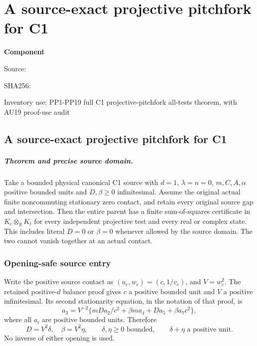 \chapter{A source-exact projective pitchfork for C1}
\label{component:p2cdf6197677b}
\noindent\textbf{Component }\par
{\small\noindent Source: \par}
{\small\noindent SHA256: \par}
{\small\noindent Inventory use: PP1-PP19 full C1 projective-pitchfork all-tests theorem, with AU19 proof-use audit\par}
\medskip
\section{A source-exact projective pitchfork for C1}
\label{p2cdf6197677b:sec:new-c1-projective-pitchfork}

\paragraph{Theorem and precise source domain.}
Take a bounded physical canonical C1 source with $d=1$,
$\lambda=n=0$, $m,C,A,\alpha$ positive bounded units and
$D,\beta\geq0$ infinitesimal. Assume the original actual finite
noncommuting stationary zero contact, and retain every original
source gap and intersection. Then the entire parent has a finite
sum-of-squares certificate in $K_c\otimes_{\mathbb R}K_t$ for
every independent projective test and every real or complex state.
This includes literal $D=0$ or $\beta=0$ whenever allowed by the
source domain. The two cannot vanish together at an actual contact.

\subsection{Opening-safe source entry}

Write the positive source contact as $(u_c,w_c)=(c,1/v_c)$,
and $V=w_c^2$. The retained positive-$d$ balance proof gives
$c$ a positive bounded unit and $V$ a positive infinitesimal.
Its second stationarity equation, in the notation of that proof, is
\[
 a_3=V^{-2}\{mDa_2/c^2+\beta ma_4+Da_5+\beta a_7c^2\},
 \tag{PP1}
\]
where all $a_i$ are positive bounded units. Therefore
\[
 D=V^2\delta,\quad\beta=V^2\eta,\qquad
 \delta,\eta\geq0\text{ bounded},\qquad
 \delta+\eta\text{ a positive unit}.
 \tag{PP2}
\]
No inverse of either opening is used.

